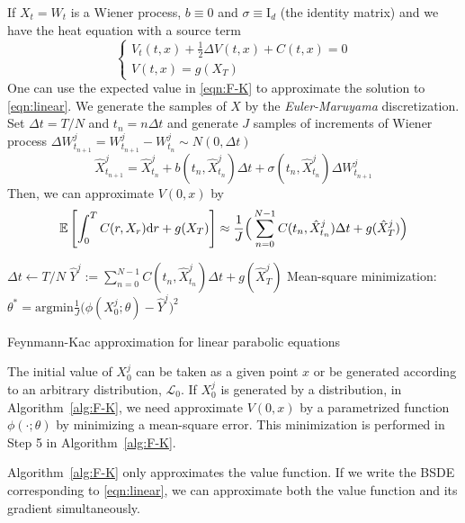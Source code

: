 \documentclass[11pt]{book}
\newcommand{\dr}{\text{\normalfont d}r}
\begin{document}
If $X_t=W_t$ is a Wiener process, $b\equiv0$ and $\sigma\equiv \text{I}_d$ (the identity matrix) and we have the heat equation with a source term
\[
\begin{cases}
    V_t(t,x)+\frac12\Delta V(t,x) + C(t,x) = 0\\
    V(t,x) = g(X_T)
\end{cases}
\]
One can use the expected value in \eqref{eqn:F-K} to approximate the solution to \eqref{eqn:linear}. We generate the samples of $X$ by the \emph{Euler-Maruyama} discretization. Set $\Delta t = T/N$ and $t_n=n\Delta t$ and generate $J$ samples of increments of Wiener process $\Delta W_{t_{n+1}}^j=W_{t_{n+1}}^j-W_{t_{n}}^j\sim N(0,\Delta t)$
\begin{equation}
\label{eqn:Euler-Maruyama}
    \hat{X}^j_{t_{n+1}} = \hat{X}^j_{t_{n}} + b(t_n,\hat{X}_{t_n}^j)\Delta t+\sigma(t_n,\hat{X}_{t_n}^j)\Delta W_{t_{n+1}}^j
\end{equation}
Then, we can approximate $V(0,x)$ by
\[
\mathbb{E}\left[\int_0^T C(r,X_r){{\dr}}+g(X_T)\right]\approx\frac{1}{J}\Big(\sum_{n=0}^{N-1} C(t_n,\hat{X}_{t_n}^j)\Delta t+g(\hat{X}_T^j)\Big)
\]
\begin{algorithm}
        $\Delta t \gets T/N$\;
        $\hat{Y}^j:=\sum_{n=0}^{N-1}C(t_n,\hat{X}_{t_n}^j)\Delta t+g(\hat{X}_T^j)$\;
        Mean-square minimization: $\theta^*=\text{argmin}\frac{1}{J} \Big(\phi(X_0^j;\theta)-\hat{Y}^j\Big)^2$\;
        \caption{Feynmann-Kac approximation for linear parabolic equations}
        \label{alg:F-K}
\end{algorithm}
The initial value of $X_0^j$ can be taken as a given point $x$ or be generated according to an arbitrary distribution, $\mathcal{L}_0$. 
If $X_0^j$ is generated by a distribution, in Algorithm~\ref{alg:F-K}, we need approximate $V(0,x)$ by a parametrized function $\phi(\cdot;\theta)$ by minimizing a mean-square error. This minimization is performed in Step 5 in  Algorithm~\ref{alg:F-K}.

Algorithm~\ref{alg:F-K} only approximates the value function. If we write the BSDE corresponding to \eqref{eqn:linear}, we can approximate both the value function and its gradient simultaneously.
\end{document}
